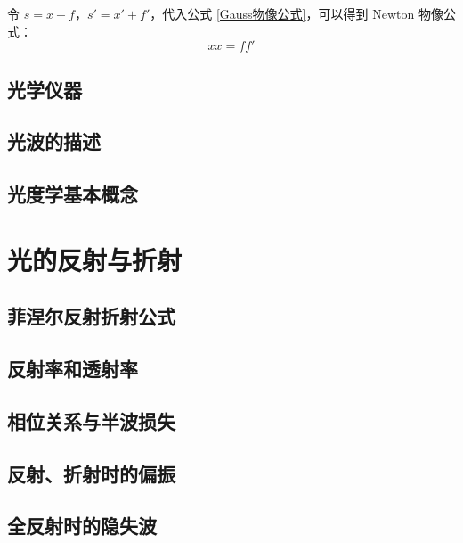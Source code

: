 \documentclass[UTF8]{report}
\theoremstyle{MyLineTheoremStyle} %
\theoremstyle{MyBlockTheoremStyle} %
\theoremstyle{MySubsubsectionStyle} %
\begin{document}
令 $s = x + f$，$s' = x' + f'$，代入公式 \ref{Gauss物像公式}，可以得到 Newton 物像公式：
\begin{equation}
xx = ff'
\end{equation}



\section{光学仪器}
\section{光波的描述}
\section{光度学基本概念}

\chapter{光的反射与折射}\thispagestyle{fancy}

\section{菲涅尔反射折射公式}
\section{反射率和透射率}
\section{相位关系与半波损失}
\section{反射、折射时的偏振}
\section{全反射时的隐失波}
\end{document}
